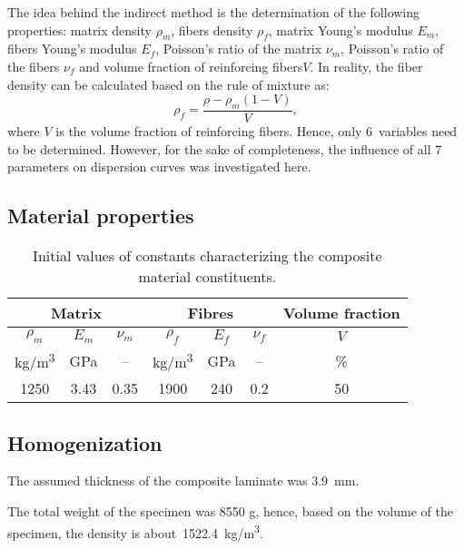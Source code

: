 \documentclass[]{spie}  %
\begin{document}
The idea behind the indirect method is the determination of the following properties: matrix  density \(\rho_m\), fibers density \(\rho_f\), matrix Young's modulus \(E_m\), fibers Young's  modulus \(E_f\), Poisson's ratio of the matrix \(\nu_m\), Poisson's ratio of the fibers \(\nu_f\)  and  volume fraction of reinforcing fibers\(V\).  
In reality, the fiber density can be calculated based on  the rule of mixture as:
\begin{equation}
\rho_f = \frac{\rho - \rho_m (1-V)}{V},
\label{eq:rho}
\end{equation}
where $V$ is the volume fraction of reinforcing fibers. 
Hence, only 6~variables need to be determined. 
However, for the sake of completeness, the influence of all 7 parameters on dispersion curves was investigated here.


\subsection{Material properties}
\begin{table}[ht]
	\renewcommand{\arraystretch}{1.3}
	\caption{Initial values of constants characterizing the composite material 
		constituents.}
	\label{tab:matprop}
	\begin{center}	
		\begin{tabular}{ccccccc} 
			\toprule
			\multicolumn{3}{c}{\textbf{Matrix} }	& \multicolumn{3}{c}{\textbf{Fibres} } & 
			\textbf{Volume fraction}	 \\ 
			\midrule
			\(\rho_m\) & \(E_m\) & \(\nu_m\)  & \(\rho_f\) & \(E_f\) & \(\nu_f\) & \(V\)\\
			kg/m\textsuperscript{3} &GPa& --  & kg/m\textsuperscript{3}  & GPa& -- & \%\\ 
			\cmidrule(lr){1-3} \cmidrule(lr){4-6} \cmidrule(lr){7-7}
			1250 &3.43& 0.35& 1900 & 240 & 0.2 & 50\\
			\bottomrule 
		\end{tabular} 
	\end{center}
\end{table}

\subsection{Homogenization}
The assumed thickness of the composite laminate was 3.9~mm. 

The total weight of the specimen was 8550 g, hence, based on the volume of the 
specimen, the density is about~1522.4~kg/m\textsuperscript{3}.
\end{document}
